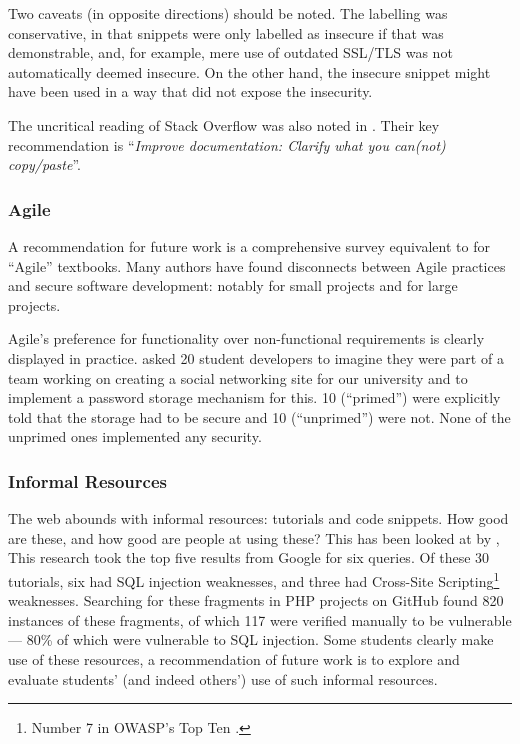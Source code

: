 \documentclass[conference]{IEEEtran}
\begin{document}
Two caveats (in opposite directions) should be noted. The labelling was conservative, in that snippets were only labelled as insecure if that was demonstrable, and, for example, mere use of outdated SSL/TLS was not automatically deemed insecure. On the other hand, the insecure snippet might have been used in a way that did not expose the insecurity.
\par
The uncritical reading of Stack Overflow was also noted in \cite[Slide 29]{Votipkaetal2019a}. Their key recommendation  \cite[Slide 32]{Votipkaetal2019a} is ``{\emph{Improve documentation: Clarify what you can(not) copy/paste}}''. 

\subsubsection{Agile}

A recommendation for future work is a comprehensive survey equivalent to \cite{Drop2019} for ``Agile'' textbooks. Many authors have found disconnects between Agile practices and secure software development: notably \cite{Bartsch2011a} for small projects and \cite{vanderHeijden:2018:EPS:3239235.3267426} for large projects.
\par
Agile's preference for functionality over non-functional requirements is clearly displayed in practice. \cite{Naiakshinaetal2017a} asked 20 student developers to imagine they
were part of a team working on creating a social networking site for
our university and to implement a password storage mechanism for this. 10 (``primed'') were explicitly told that the storage had to be secure and 10 (``unprimed'') were not. None of the unprimed ones implemented any security.

\subsubsection{Informal Resources}\label{sec:informal}

The web abounds with informal resources: tutorials and code snippets. How good are these, and how good are people at using these? This has been looked at by \cite{Unruhetal2017a}, This research took the top five results from Google for six queries. Of these 30 tutorials, six had SQL injection weaknesses, and three had Cross-Site Scripting\footnote{Number 7 in OWASP's Top Ten \cite{OWASP2017a}.} weaknesses. Searching for these fragments in PHP projects on GitHub found 820 instances of these fragments, of which 117 were verified manually to be vulnerable --- 80\% of which were vulnerable to SQL injection. Some students clearly make use of these resources, a recommendation of future work is to explore and evaluate students' (and indeed others') use of such informal resources. 
\end{document}
